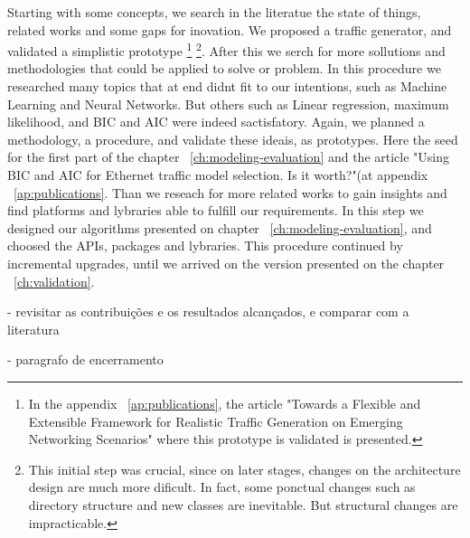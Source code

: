 Starting with some concepts, we search in the literatue the state of things, related works and some gaps for inovation. We proposed a traffic generator, and validated a simplistic prototype \footnote{In the appendix ~\ref{ap:publications}, the  article "Towards a Flexible and Extensible Framework for Realistic Traffic Generation on Emerging Networking Scenarios" where this prototype is validated is presented.} \footnote{This initial step was crucial, since on later stages, changes on the architecture design are much more dificult. In fact, some ponctual changes such as directory structure and new classes are inevitable. But structural changes are impracticable.}. After this we serch for more sollutions and methodologies that could be applied to solve or problem. In this procedure we researched many topics that at end didnt fit to our intentions, such as Machine Learning and Neural Networks. But others such as Linear regression, maximum likelihood, and BIC and AIC were indeed sactisfatory. Again, we planned a methodology, a procedure, and validate these ideais, as prototypes. Here the seed for the first part of the chapter ~\ref{ch:modeling-evaluation} and the article "Using BIC and AIC for Ethernet traffic model selection. Is it worth?"(at appendix ~\ref{ap:publications}. Than we reseach for more related works to  gain insights and find platforms and lybraries able to fulfill our requirements. In this step we designed our algorithms presented on chapter ~\ref{ch:modeling-evaluation}, and choosed the APIs, packages and lybraries. This procedure continued by incremental upgrades, until we arrived on the version presented on the chapter ~\ref{ch:validation}.  





- revisitar as contribuições e os resultados alcançados, e comparar com a literatura

- paragrafo de encerramento









